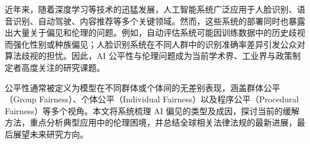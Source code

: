 
近年来，随着深度学习等技术的迅猛发展，人工智能系统广泛应用于人脸识别、语音识别、自动驾驶、内容推荐等多个关键领域\cite{Mehrabi2021Survey}。然而，这些系统的部署同时也暴露出大量关于偏见和伦理的问题。例如，自动评估系统可能因训练数据中的历史歧视而强化性别或种族偏见；人脸识别系统在不同人群中的识别准确率差异引发公众对算法歧视的担忧。因此，AI 公平性与伦理问题成为当前学术界、工业界与政策制定者高度关注的研究课题。

公平性通常被定义为模型在不同群体或个体间的无差别表现，涵盖群体公平（Group Fairness）、个体公平（Individual Fairness）以及程序公平（Procedural Fairness）等多个视角\cite{Binns2018Fairness}。本文将系统梳理 AI 偏见的类型及成因，探讨当前的缓解方法，重点分析典型应用中的伦理困境，并总结全球相关法律法规的最新进展，最后展望未来研究方向。